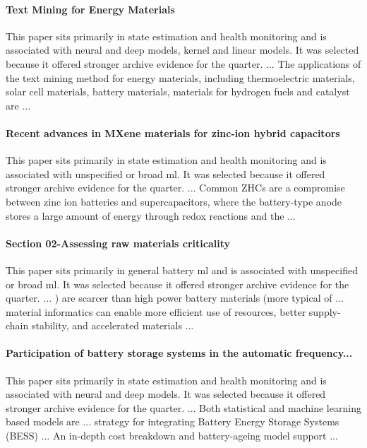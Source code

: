 \documentclass[conference]{IEEEtran}
\begin{document}
\paragraph{Text Mining for Energy Materials} This paper sits primarily in state estimation and health monitoring and is associated with neural and deep models, kernel and linear models. It was selected because it offered stronger archive evidence for the quarter. ... The applications of the text mining method for energy materials, including thermoelectric materials, solar cell materials, battery materials, materials for hydrogen fuels and catalyst are ... \cite{textminingfor2022}

\paragraph{Recent advances in MXene materials for zinc-ion hybrid capacitors} This paper sits primarily in state estimation and health monitoring and is associated with unspecified or broad ml. It was selected because it offered stronger archive evidence for the quarter. ... Common ZHCs are a compromise between zinc ion batteries and supercapacitors, where the battery-type anode stores a large amount of energy through redox reactions and the ... \cite{recentadvancesin2025}

\paragraph{Section 02-Assessing raw materials criticality} This paper sits primarily in general battery ml and is associated with unspecified or broad ml. It was selected because it offered stronger archive evidence for the quarter. ... ) are scarcer than high power battery materials (more typical of ... material informatics can enable more efficient use of resources, better supply-chain stability, and accelerated materials ... \cite{section02assessingna}

\paragraph{Participation of battery storage systems in the automatic frequency...} This paper sits primarily in state estimation and health monitoring and is associated with neural and deep models. It was selected because it offered stronger archive evidence for the quarter. ... Both statistical and machine learning based models are ... strategy for integrating Battery Energy Storage Systems (BESS) ... An in-depth cost breakdown and battery-ageing model support ... \cite{participationofbattery2020}
\end{document}
